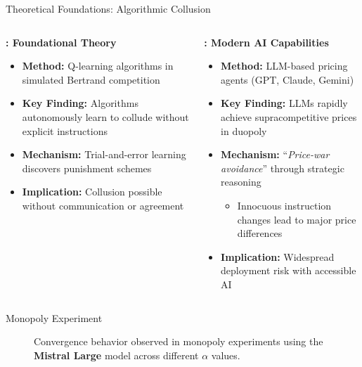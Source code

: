 \documentclass[10pt, aspectratio=169]{beamer}
\begin{document}
\begin{frame}{Theoretical Foundations: Algorithmic Collusion}
    \begin{columns}[c]
    \begin{block}{\textbf{\textcite{calvano_artificial_2020}: Foundational Theory}}
    \begin{itemize}
        \item \textbf{Method:} Q-learning algorithms in simulated Bertrand competition
        \item \textbf{Key Finding:} Algorithms autonomously learn to collude without explicit instructions
        \item \textbf{Mechanism:} Trial-and-error learning discovers punishment schemes
        \item \textbf{Implication:} Collusion possible without communication or agreement
    \end{itemize}
    \end{block}
    
    \begin{block}{\textbf{\textcite{fish_algorithmic_2025}: Modern AI Capabilities}}
    \begin{itemize}
        \item \textbf{Method:} LLM-based pricing agents (GPT, Claude, Gemini)
        \item \textbf{Key Finding:} LLMs rapidly achieve supracompetitive prices in duopoly
        \item \textbf{Mechanism:} \enquote{\emph{Price-war avoidance}} through strategic reasoning
        \begin{itemize}
            \item Innocuous instruction changes lead to major price differences
        \end{itemize}
        \item \textbf{Implication:} Widespread deployment risk with accessible AI
    \end{itemize}
    \end{block}
    \end{columns}
\end{frame}

\begin{frame}{Monopoly Experiment}\label{}
\begin{figure}[htpb!]
    \centering
    
    \caption{Convergence behavior observed in monopoly experiments using the \textbf{Mistral Large} model across different $\alpha$ values.}
    \label{fig:monopoly_convergence}
\end{figure}
\hfill\hyperlink{app:calvano}{}
\end{frame}
\end{document}

